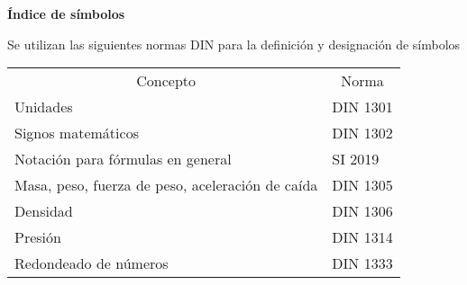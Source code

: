 

\newpage
{}
\tableofcontents 
\newpage

\listoffigures 
\newpage

\listoftables 
\newpage


\begin{center}
	{\Large  \textbf{Índice de símbolos}}
\end{center}

Se utilizan las siguientes normas DIN para la definición y designación de símbolos\\

\begin{mytable}[H]
	\centering
	\begin{tabular}{ll}
		\multicolumn{1}{c}{Concepto} & \multicolumn{1}{c}{Norma} \\
		Unidades & DIN 1301 \\
		Signos matemáticos & DIN 1302 \\
		Notación para fórmulas en general & SI 2019 \\
		Masa, peso, fuerza de peso, aceleración de caída & DIN 1305 \\
		Densidad & DIN 1306 \\
		Presión & DIN 1314 \\
		Redondeado de números & DIN 1333 \\
	\end{tabular}
\end{mytable}


